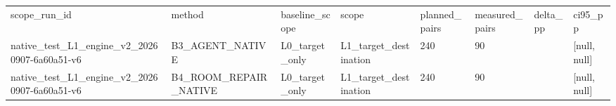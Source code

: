 \begin{tabular}{llllllll}
scope\_run\_id & method & baseline\_scope & scope & planned\_pairs & measured\_pairs & delta\_pp & ci95\_pp \\
native\_test\_L1\_engine\_v2\_20260907-6a60a51-v6 & B3\_AGENT\_NATIVE & L0\_target\_only & L1\_target\_destination & 240 & 90 &  & [null, null] \\
native\_test\_L1\_engine\_v2\_20260907-6a60a51-v6 & B4\_ROOM\_REPAIR\_NATIVE & L0\_target\_only & L1\_target\_destination & 240 & 90 &  & [null, null] \\
\end{tabular}
